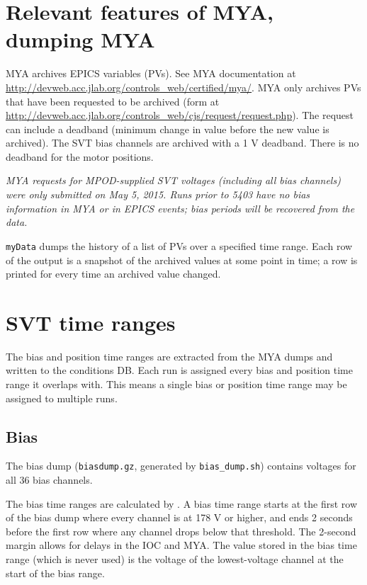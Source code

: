 \documentclass[aps,amsmath,amssymb,notitlepage,11pt,onecolumn]{revtex4-1}
\begin{document}
\section{Relevant features of MYA, dumping MYA}
MYA archives EPICS variables (PVs).
See MYA documentation at \url{http://devweb.acc.jlab.org/controls_web/certified/mya/}.
MYA only archives PVs that have been requested to be archived (form at \url{http://devweb.acc.jlab.org/controls_web/cjs/request/request.php}).
The request can include a deadband (minimum change in value before the new value is archived).
The SVT bias channels are archived with a 1 V deadband.
There is no deadband for the motor positions.

\emph{MYA requests for MPOD-supplied SVT voltages (including all bias channels) were only submitted on May 5, 2015. Runs prior to 5403 have no bias information in MYA or in EPICS events; bias periods will be recovered from the data.}

\texttt{myData} dumps the history of a list of PVs over a specified time range.
Each row of the output is a snapshot of the archived values at some point in time; a row is printed for every time an archived value changed.

\section{SVT time ranges}
The bias and position time ranges are extracted from the MYA dumps and written to the conditions DB.
Each run is assigned every bias and position time range it overlaps with.
This means a single bias or position time range may be assigned to multiple runs.

\subsection{Bias}
The bias dump (\texttt{biasdump.gz}, generated by \texttt{bias\_dump.sh}) contains voltages for all 36 bias channels.

The bias time ranges are calculated by .
A bias time range starts at the first row of the bias dump where every channel is at 178 V or higher, and ends 2 seconds before the first row where any channel drops below that threshold.
The 2-second margin allows for delays in the IOC and MYA.
The value stored in the bias time range (which is never used) is the voltage of the lowest-voltage channel at the start of the bias range.
\end{document}
